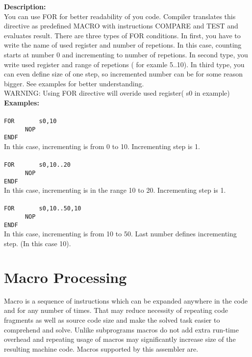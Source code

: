             \textbf{Description:}\\
            You can use FOR for better readability of you code. Compiler translates this directive as predefined MACRO with instructions COMPARE and TEST and
            evaluates result. There are three types of FOR conditions. In first, you have to write the name of used register and number of repetions. In this case,
            counting starts at number 0 and incrementing to number of repetions. In second type, you write used register and range of
            repetions ( for examle 5..10). In third type, you can even define size of one step, so incremented number can be for some reason bigger.
            See examples for better understanding.\\ WARNING: Using FOR directive will overide used register( s0 in example)
            \textbf{Examples:}\\
        {
            ~\\
            \usecodefont
            \verb'FOR       s0,10'\\
            \verb'      NOP'\\
            \verb'ENDF'
        }\\
        In this case, incrementing is from 0 to 10. Incrementing step is 1.\\
        {
            ~\\
            \usecodefont
            \verb'FOR       s0,10..20'\\
            \verb'      NOP'\\
            \verb'ENDF'
        }\\

        In this case, incrementing is in the range 10 to 20. Incrementing step is 1.\\
        {
            ~\\
            \usecodefont
            \verb'FOR       s0,10..50,10'\\
            \verb'      NOP'\\
            \verb'ENDF'
        }\\
        In this case, incrementing is from 10 to 50. Last number defines incrementing step. (In this case 10).\\

    \section{Macro Processing}
        Macro is a sequence of instructions which can be expanded anywhere in the code and for any number of times. That may reduce necessity of
        repeating code fragments as well as source code size and make the solved task easier to comprehend and solve. Unlike subprograms macros do
        not add extra run-time overhead and repeating usage of macros may significantly increase size of the resulting machine code. Macros supported
        by this assembler are.


